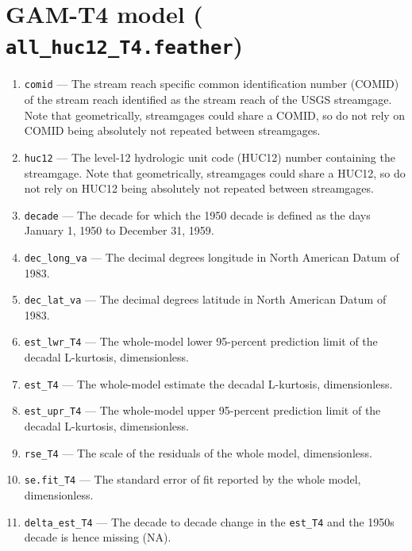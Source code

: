 \documentclass[1p, authoryear, 11pt, times, preprint]{elsarticle}
\newcommand{\code}[1]{{\color{black}%
                       \mbox{\lstinline[basicstyle={\small\ttfamily},
                                        keywordstyle=\scriptsize\ttfamily]|#1|}}}
\begin{document}
\section{GAM-T4 model (\code{all_huc12_T4.feather})}
\begin{enumerate}
\footnotesize
\RaggedRight
\item \code{comid} --- The stream reach specific common identification number (COMID) of the stream reach identified as the stream reach of the USGS streamgage. Note that geometrically, streamgages could share a COMID, so do not rely on COMID being absolutely not repeated between streamgages.
\item \code{huc12} --- The level-12 hydrologic unit code (HUC12) number containing the streamgage. Note that geometrically, streamgages could share a HUC12, so do not rely on HUC12 being absolutely not repeated between streamgages.
\item \code{decade} --- The decade for which the 1950 decade is defined as the days January 1, 1950 to December 31, 1959.
\item \code{dec_long_va} --- The decimal degrees longitude in North American Datum of 1983.
\item \code{dec_lat_va} --- The decimal degrees latitude in North American Datum of 1983.
\item \code{est_lwr_T4} --- The whole-model lower 95-percent prediction limit of the decadal L-kurtosis, dimensionless.
\item \code{est_T4} --- The whole-model estimate the decadal L-kurtosis, dimensionless.
\item \code{est_upr_T4} --- The whole-model upper 95-percent prediction limit of the decadal L-kurtosis, dimensionless.
\item \code{rse_T4} --- The scale of the residuals of the whole model, dimensionless.
\item \code{se.fit_T4} --- The standard error of fit reported by the whole model, dimensionless.
\item \code{delta_est_T4} --- The decade to decade change in the \code{est_T4} and the 1950s decade is hence missing (NA).
\end{enumerate}


 
\end{document}

